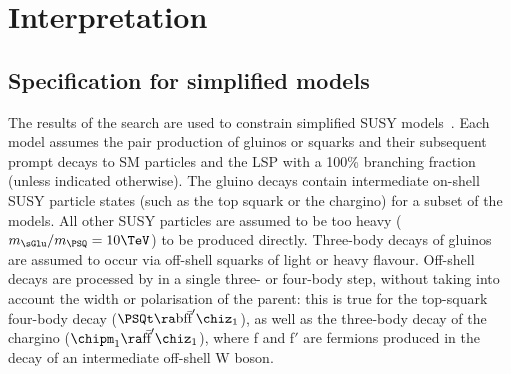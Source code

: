 \section{Interpretation} 
\label{sec:interpretations}

\subsection{Specification for simplified models} 

The results of the search are used to constrain simplified SUSY
models~\cite{Alwall:2008ag, Alwall:2008va, sms}. Each model assumes
the pair production of gluinos or squarks and their subsequent prompt
decays to SM particles and the LSP with a 100\% branching fraction
(unless indicated otherwise). The gluino decays contain intermediate
on-shell SUSY particle states (such as the top squark or the chargino)
for a subset of the models. All other SUSY particles are assumed to be
too heavy ($m_{\sGlu} / m_{\PSQ} = 10\TeV$) to be produced
directly. Three-body decays of gluinos are assumed to occur via
off-shell squarks of light or heavy flavour. Off-shell decays are
processed by \PYTHIA in a single three- or four-body step, without
taking into account the width or polarisation of the parent: this is
true for the top-squark four-body decay ($\PSQt \ra
\text{bf}\bar{\text{f}}'\chiz_1$), as well as the three-body decay of
the chargino ($\chipm_1 \ra \text{f}\bar{\text{f}}'\chiz_1$), where f
and f$'$ are fermions produced in the decay of an intermediate
off-shell W boson.

